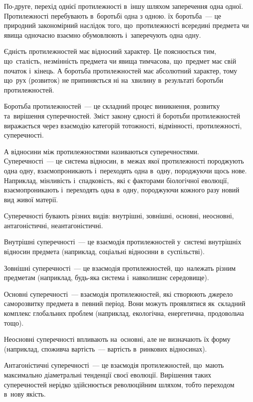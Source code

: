 \documentclass[a5paper,oneside,DIV=12,12pt,headings=small]{scrartcl}
\begin{document}
		По-друге, перехід однієї протилежності в~іншу шляхом заперечення одна одної. Протилежності перебувають в~боротьбі одна з одною. їх боротьба~— це природний закономірний наслідок того, що~протилежності всередині предмета чи явища одночасно взаємно обумовлюють і~заперечують одна одну.
		
		Єдність протилежностей має відносний характер. Це пояснюється тим, що~сталість, незмінність предмета чи явища тимчасова, що~предмет має свій початок і~кінець. А боротьба протилежностей має абсолютний характер, тому що~рух (розвиток) не припиняється ні на~хвилину в~результаті боротьби протилежностей.
		
		Боротьба протилежностей~— це складний процес виникнення, розвитку та~вирішення суперечностей. Зміст закону єдності й боротьби протилежностей виражається через взаємодію категорій тотожності, відмінності, протилежності, суперечності.
		
		А відносини між протилежностями називаються суперечностями. Суперечності~— це система відносин, в~межах якої протилежності породжують одна одну, взаємопроникають і~переходять одна в~одну, породжуючи щось нове. Наприклад, мінливість і~спадковість, які є факторами біологічної еволюції, взаємопроникають і~переходять одна в~одну, породжуючи кожного разу новий вид живої матерії.
		
		Суперечності бувають різних видів: внутрішні, зовнішні, основні, неосновні, антагоністичні, неантагоністичні.
		
		Внутрішні суперечності~— це взаємодія протилежностей у~системі внутрішніх відносин предмета (наприклад, соціальні відносини в~суспільстві).
		
		Зовнішні суперечності~— це взаємодія протилежностей, що~належать різним предметам (наприклад, будь-яка система і~навколишнє середовище).
		
		Основні суперечності~— взаємодія протилежностей, які створюють джерело саморозвитку предмета в~певний період. Вони можуть проявлятися як~складний комплекс глобальних проблем (наприклад, екологічна, енергетична, продовольча тощо).
		
		Неосновні суперечності впливають на~основні, але не визначають їх форму (наприклад, споживча вартість~— вартість в~ринкових відносинах).
		
		Антагоністичні суперечності~— це взаємодія протилежностей, що~мають максимально діаметральні тенденції своєї еволюції. Вирішення таких суперечностей нерідко здійснюється революційним шляхом, тобто переходом в~нову якість.
		
\end{document}
